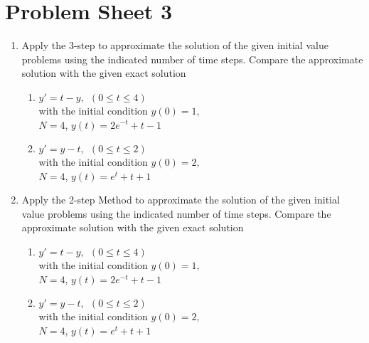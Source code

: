 \newpage
\section{Problem Sheet 3}
\begin{enumerate}
\item
Apply the 3-step  to approximate the solution of the given initial value problems using the indicated number of time steps. Compare the approximate solution with the given exact solution
\begin{enumerate}
\item
$y'=t-y, \ \ (0\leq t \leq 4)$\\
with the initial condition $y(0)=1,$\\
$N=4$, 
$y(t)=2e^{-t}+t-1$\\

\item 
$y'=y-t, \ \ (0\leq t \leq 2)$\\
with the initial condition $y(0)=2,$\\
$N=4$, 
$y(t)=e^{t}+t+1$\\

\end{enumerate}
\item
Apply the 2-step  Method to approximate the solution of the given initial value problems using the indicated number of time steps. Compare the approximate solution with the given exact solution
\begin{enumerate}
\item
$y'=t-y, \ \ (0\leq t \leq 4)$\\
with the initial condition $y(0)=1,$\\
$N=4$, 
$y(t)=2e^{-t}+t-1$\\

\item 
$y'=y-t, \ \ (0\leq t \leq 2)$\\
with the initial condition $y(0)=2,$\\
$N=4$, 
$y(t)=e^{t}+t+1$\\


\end{enumerate}
\end{enumerate}
